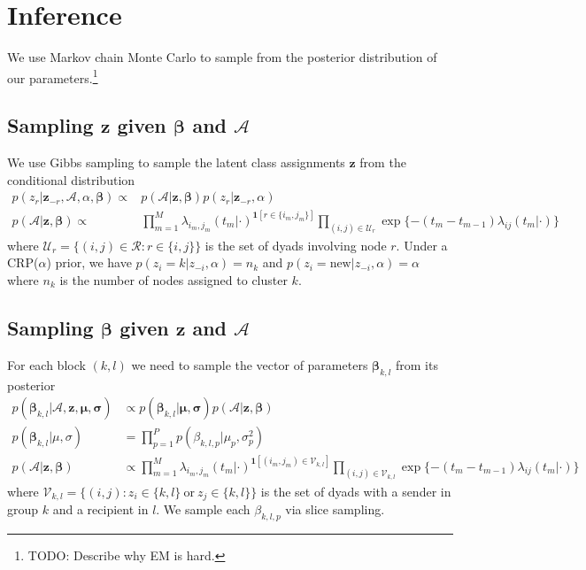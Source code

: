 \section{Inference}

We use Markov chain Monte Carlo to sample from the posterior distribution of our parameters.\footnote{TODO: Describe why EM is hard.} %

\subsection{Sampling $\mathbf{z}$ given $\boldsymbol{\beta}$ and $\mathcal{A}$ }

We use Gibbs sampling to sample the latent class assignments $\mathbf{z}$ from the conditional distribution
\begin{align*}
p(z_r | \mathbf{z}_{-r},\mathcal{A},\alpha,\boldsymbol{\beta}) \propto&  p(\mathcal{A}|\mathbf{z},\boldsymbol{\beta}) p(z_r | \mathbf{z}_{-r},\alpha) \\
p(\mathcal{A}|\mathbf{z},\boldsymbol{\beta}) \propto &
\prod_{m=1}^M \lambda_{i_m,j_m}(t_m|\cdot)^{\mathbf{1}[r \in \{i_m,j_m\}]}  \prod_{(i,j) \in \mathcal{U}_r} \exp \{ -(t_m - t_{m-1}) \lambda_{ij}(t_m|\cdot)\}
\end{align*}
where $\mathcal{U}_r = \{(i,j) \in \mathcal{R}: r \in \{i,j\}\}$ is the set of dyads involving node $r$.
Under a CRP($\alpha$) prior, we have $p(z_i = k | z_{-i},\alpha) = n_k $ and $p(z_i = \mbox{new} |  z_{-i},\alpha) = \alpha$ where $n_k$ is the number of nodes assigned to cluster $k$.

\subsection{Sampling $\boldsymbol{\beta}$ given $\mathbf{z}$ and $\mathcal{A}$ }

For each block $(k,l)$ we need to sample the vector of parameters $\boldsymbol{\beta}_{k,l}$ from its posterior
\begin{align*}
p(\boldsymbol{\beta}_{k,l} | \mathcal{A}, \textbf{z}, \boldsymbol{\mu}, \boldsymbol{\sigma}) &\propto p(\boldsymbol{\beta}_{k,l} | \boldsymbol{\mu}, \boldsymbol{\sigma}) p( \mathcal{A}| \textbf{z}, \boldsymbol{\beta}) \\
p(\boldsymbol{\beta}_{k,l} | \mu, \sigma) &= \prod_{p=1}^Pp(\beta_{k,l,p}|\mu_p,\sigma_p^2)\\
p(\mathcal{A}|\mathbf{z},\boldsymbol{\beta}) &\propto \prod_{m=1}^M \lambda_{i_m,j_m}(t_m|\cdot)^{\mathbf{1}[(i_m,j_m) \in \mathcal{V}_{k,l}]}
\prod_{(i,j) \in \mathcal{V}_{k,l}} \exp \{ -(t_m - t_{m-1}) \lambda_{ij}(t_m|\cdot)\}
\end{align*}
where $\mathcal{V}_{k,l} = \{(i,j): z_{i} \in \{k,l\} \ \mbox{or} \ z_{j} \in \{k,l\} \}$ is the set of dyads with a sender in group $k$ and a recipient in $l$.  We sample each $\beta_{k,l,p}$ via slice sampling.

